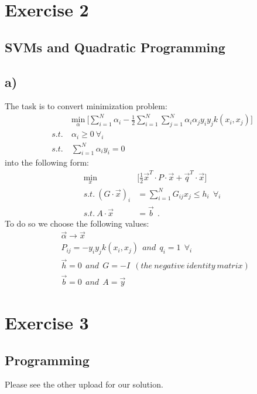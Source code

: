 \documentclass{article}
\begin{document}
\section*{Exercise 2}

\subsection*{SVMs and Quadratic Programming}

\subsection*{a)}
The task is to convert minimization problem:
\begin{align}
&\underset{\alpha}{\text{min}}~\bigg[\sum \limits _{i=1}^{N}\alpha_i-\frac{1}{2}\sum \limits _{i=1}^{N}\sum \limits _{j=1}^{N}\alpha_i\alpha_jy_iy_jk(x_i,x_j)\bigg]\\
s.t.~&\alpha_i\geq 0~ \forall_i\\
s.t.~&\sum \limits _{i=1}^{N}\alpha_iy_i=0
\end{align}
into the following form:
\begin{align}
\underset{x}{\text{min}}~&\bigg[\frac{1}{2}\vec{x}^T\cdot P \cdot \vec{x}+\vec{q}^T\cdot \vec{x} \bigg]\\
s.t.~(G\cdot\vec{x})_i&=\sum \limits _{i=1}^{N}G_{ij}x_j \leq h_i ~~ \forall_i\\
s.t.~A\cdot\vec{x}&=\vec{b}~~.
\end{align}
To do so we choose the following values:
\begin{align}
&\vec{\alpha} \rightarrow \vec{x}\\
&P_{ij} = -y_iy_jk(x_i,x_j) ~~ and ~~ q_i=1 ~~\forall_i\\
&\vec{h}=0~~and ~~G=-I~~(the~negative~identity~matrix)\\
&\vec{b}=0~~and~~A=\vec{y}
\end{align}
\section*{Exercise 3}

\subsection*{Programming}

Please see the other upload for our solution.
\end{document}
